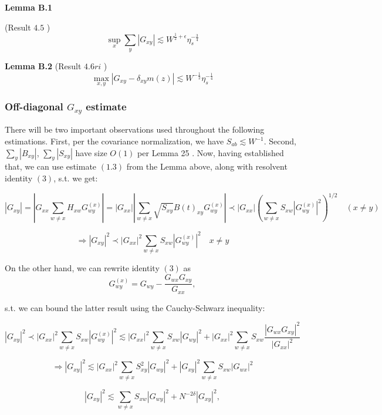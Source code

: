 \documentclass[11pt]{article}
\newenvironment{boxt}[1]
  {\begin{mdframed}\noindent\textbf{#1}\normalfont\space}
  {\end{mdframed}}
\begin{document}
\begin{boxt}{Lemma B.1} \label{lemma-b1}

(Result $4.5$ \cite{bandSDE})
$$\sup_x \sum_y |G_{xy}|\lesssim W^{\frac{1}{2}+\epsilon} \eta_s^{-\frac{3}{4}}$$
\end{boxt}

\begin{boxt}{Lemma B.2} \label{lemma-b2}
(Result $4.6ri$ \cite{bandSDE})
$$\max_{x, y} |G_{xy} - \delta_{xy}m(z)|\lesssim W^{-\frac{1}{2}} \eta_s^{-\frac{1}{4}}
$$
\end{boxt}


\subsubsection*{Off-diagonal $G_{xy}$ estimate}
There will be two important observations used throughout the following estimations. First, per the covariance normalization, we have $S_{ab}\lesssim W^{-1}$. Second, $\sum_{y}|B_{xy}|$, $\sum_{y}|S_{xy}|$ have size $O(1)$ per Lemma 25 \cite{bandSDE}. Now, having established that, we can use estimate $(1.3)$ from the Lemma above, along with resolvent identity $(3)$, s.t. we get:

$$|G_{xy}| = \left\vert G_{xx}\sum_{w\neq x}H_{xw}G^{(x)}_{wy}\right\vert= |G_{xx}|\left\vert\sum_{w\neq x}\sqrt{S_{xy}}B(t)_{xy}G^{(x)}_{wy}\right\vert\prec  |G_{xx}|\left(\sum_{w\neq x}S_{xw}|G^{(x)}_{wy}|^2\right)^{1/2}\quad (x\neq y)$$

\begin{equation*}\Rightarrow |G_{xy}|^2\prec |G_{xx}|^2\sum_{w\neq x}S_{xw}|G^{(x)}_{wy}|^2\quad x\neq y\tag{3.1}\end{equation*}

On the other hand, we can rewrite identity $(3)$ as $$G_{wy}^{(x)} = G_{wy}-\frac{G_{wx}G_{xy}}{G_{xx}},$$

s.t. we can bound the latter result using the Cauchy-Schwarz inequality: 

$$|G_{xy}|^2\prec |G_{xx}|^2\sum_{w\neq x}S_{xw}|G^{(x)}_{wy}|^2 \lesssim |G_{xx}|^2\sum_{w\neq x}S_{xw}|G_{wy}|^2+|G_{xx}|^2\sum_{w\neq x} S_{xw}\frac{|G_{wx}G_{xy}|^2}{|G_{xx}|^2}$$

\begin{equation*}\Rightarrow |G_{xy}|^2 \lesssim |G_{xx}|^2\sum_{w\neq x}S_{xy}^2|G_{wy}|^2+|G_{xy}|^2\sum_{w\neq x}S_{xw}|G_{wx}|^2 \tag{4}\end{equation*}

\begin{equation*}|G_{xy}|^2\lesssim \sum_{w\neq x}S_{xw}|G_{wy}|^2+N^{-2\delta}|G_{xy}|^2,\tag{4.1}\end{equation*}
\end{document}
